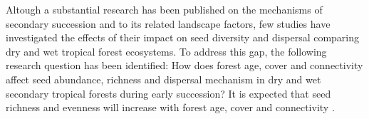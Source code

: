 


Altough a substantial research has been published on the mechanisms of secondary succession and to its related landscape factors, few studies have investigated the effects of their impact on seed diversity and dispersal comparing dry and wet tropical forest ecosystems. To address this gap, the following research question has been identified: How does forest age, cover and connectivity affect seed abundance, richness and dispersal mechanism in dry and wet secondary tropical forests during early succession? It is expected that seed richness and evenness will increase with forest age, cover and connectivity \citep{chazdonSecondGrowthPromise2014}.
